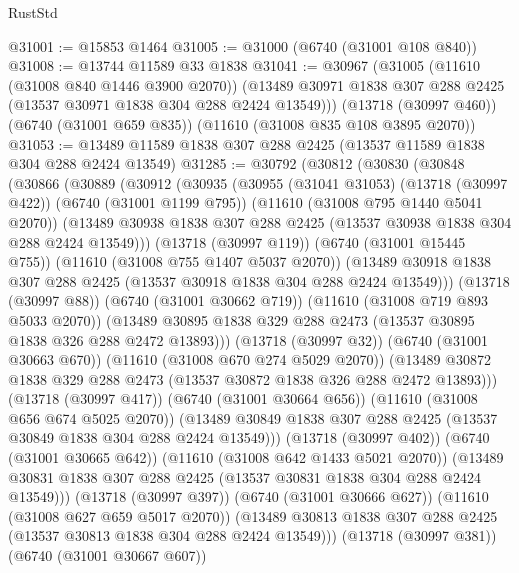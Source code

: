 \begin{lexlean}{RustStd}
\begin{coremodule}
@31001 := @15853 @1464
@31005 := @31000 (@6740 (@31001 @108 @840))
@31008 := @13744 @11589 @33 @1838
@31041 := @30967
    (@31005
      (@11610 (@31008 @840 @1446 @3900 @2070))
      (@13489 @30971 @1838 @307 @288 @2425 (@13537 @30971 @1838 @304 @288 @2424 @13549)))
    (@13718 (@30997 @460))
    (@6740 (@31001 @659 @835))
    (@11610 (@31008 @835 @108 @3895 @2070))
@31053 := @13489 @11589 @1838 @307 @288 @2425 (@13537 @11589 @1838 @304 @288 @2424 @13549)
@31285 := @30792
    (@30812
      (@30830
        (@30848
          (@30866
            (@30889
              (@30912
                (@30935
                  (@30955
                    (@31041 @31053)
                    (@13718 (@30997 @422))
                    (@6740 (@31001 @1199 @795))
                    (@11610 (@31008 @795 @1440 @5041 @2070))
                    (@13489
                      @30938
                      @1838
                      @307
                      @288
                      @2425
                      (@13537 @30938 @1838 @304 @288 @2424 @13549)))
                  (@13718 (@30997 @119))
                  (@6740 (@31001 @15445 @755))
                  (@11610 (@31008 @755 @1407 @5037 @2070))
                  (@13489
                    @30918
                    @1838
                    @307
                    @288
                    @2425
                    (@13537 @30918 @1838 @304 @288 @2424 @13549)))
                (@13718 (@30997 @88))
                (@6740 (@31001 @30662 @719))
                (@11610 (@31008 @719 @893 @5033 @2070))
                (@13489 @30895 @1838 @329 @288 @2473 (@13537 @30895 @1838 @326 @288 @2472 @13893)))
              (@13718 (@30997 @32))
              (@6740 (@31001 @30663 @670))
              (@11610 (@31008 @670 @274 @5029 @2070))
              (@13489 @30872 @1838 @329 @288 @2473 (@13537 @30872 @1838 @326 @288 @2472 @13893)))
            (@13718 (@30997 @417))
            (@6740 (@31001 @30664 @656))
            (@11610 (@31008 @656 @674 @5025 @2070))
            (@13489 @30849 @1838 @307 @288 @2425 (@13537 @30849 @1838 @304 @288 @2424 @13549)))
          (@13718 (@30997 @402))
          (@6740 (@31001 @30665 @642))
          (@11610 (@31008 @642 @1433 @5021 @2070))
          (@13489 @30831 @1838 @307 @288 @2425 (@13537 @30831 @1838 @304 @288 @2424 @13549)))
        (@13718 (@30997 @397))
        (@6740 (@31001 @30666 @627))
        (@11610 (@31008 @627 @659 @5017 @2070))
        (@13489 @30813 @1838 @307 @288 @2425 (@13537 @30813 @1838 @304 @288 @2424 @13549)))
      (@13718 (@30997 @381))
      (@6740 (@31001 @30667 @607))

\end{coremodule}
\end{lexlean}
